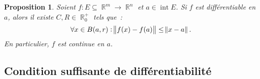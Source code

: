 \documentclass{article}
\DeclareMathOperator{\intr}{int}
\DeclareMathOperator{\R}{\mathbb R}
\newcommand{\frmrn}[2]{#1 : #2 \subseteq \R^m \to \R^n}
\newtheorem{prp}[thm]{Proposition}
\theoremstyle{definition}
\theoremstyle{remark}
\begin{document}
		\begin{prp} Soient $\frmrn fE$ et $a \in \intr E$. Si $f$ est différentiable en $a$, alors il existe $C, R \in  \R_0^+$ tels que~:
		\[\forall x \in B(a, r) : \norm{f(x)-f(a)} \leq \norm{x-a}.\]
		En particulier, $f$ est continue en $a$.
		\end{prp}

	\subsection{Condition suffisante de différentiabilité}
\end{document}
